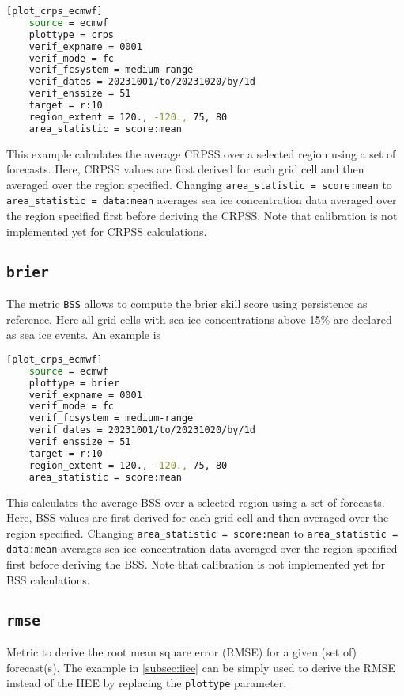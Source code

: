 \documentclass[DIV=10, parskip=full]{scrreprt}
\newcommand{\notimplement}[1]{#1}
\begin{document}
\begin{lstlisting}[language=bash]
	[plot_crps_ecmwf]
	source = ecmwf
	plottype = crps
	verif_expname = 0001
	verif_mode = fc
	verif_fcsystem = medium-range
	verif_dates = 20231001/to/20231020/by/1d
	verif_enssize = 51
	target = r:10
	region_extent = 120., -120., 75, 80
	area_statistic = score:mean
\end{lstlisting}
This example calculates the average CRPSS over a selected region using a set of forecasts. Here, CRPSS values are first derived for each grid cell and then averaged over the region specified. Changing \texttt{area\_statistic = score:mean} to \texttt{area\_statistic = data:mean}  averages sea ice concentration data averaged over the region specified first before deriving the CRPSS. \notimplement{Note that calibration is not implemented yet for CRPSS calculations.}


\subsection{\texttt{brier}}
The metric \texttt{BSS} allows to compute the brier skill score using persistence as reference. Here all grid cells with sea ice concentrations above 15\% are declared as sea ice events. An example is

\begin{lstlisting}[language=bash]
	[plot_crps_ecmwf]
	source = ecmwf
	plottype = brier
	verif_expname = 0001
	verif_mode = fc
	verif_fcsystem = medium-range
	verif_dates = 20231001/to/20231020/by/1d
	verif_enssize = 51
	target = r:10
	region_extent = 120., -120., 75, 80
	area_statistic = score:mean
\end{lstlisting}
This calculates the average BSS over a selected region using a set of forecasts. Here, BSS values are first derived for each grid cell and then averaged over the region specified. Changing \texttt{area\_statistic = score:mean} to \texttt{area\_statistic = data:mean}  averages sea ice concentration data averaged over the region specified first before deriving the BSS.  \notimplement{Note that calibration is not implemented yet for BSS calculations.}


\subsection{\texttt{rmse}}
Metric to derive the root mean square error (RMSE) for a given (set of) forecast(s). The example in \ref{subsec:iiee} can be simply used to derive the RMSE instead of the IIEE by replacing the \texttt{plottype} parameter. 
\end{document}
